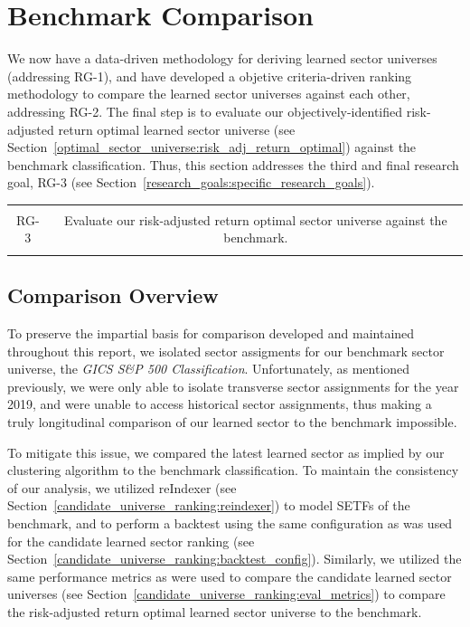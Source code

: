 \documentclass[../main.tex]{subfiles}
\begin{document}
\chapter{Benchmark Comparison} \label{benchmark_comparison}

We now have a data-driven methodology for deriving learned sector universes (addressing RG-1), and have developed a objetive criteria-driven ranking methodology to compare the learned sector universes against each other, addressing RG-2. The final step is to evaluate our objectively-identified risk-adjusted return optimal learned sector universe (see Section~\ref{optimal_sector_universe:risk_adj_return_optimal}) against the benchmark classification. Thus, this section addresses the third and final research goal, RG-3 (see Section~\ref{research_goals:specific_research_goals}).

\begin{table}[h!]
    \centering
    \begin{tabular}{| c | c |}
        \hline
        &  \\
        RG-3 & Evaluate our risk-adjusted return optimal sector universe against the benchmark. \\
        & \\
        \hline
    \end{tabular}
\end{table}

\section{Comparison Overview}

To preserve the impartial basis for comparison developed and maintained throughout this report, we isolated sector assigments for our benchmark sector universe, the \textit{GICS S\&P 500 Classification}. Unfortunately, as mentioned previously, we were only able to isolate transverse sector assignments for the year 2019, and were unable to access historical sector assignments, thus making a truly longitudinal comparison of our learned sector to the benchmark impossible.

To mitigate this issue, we compared the latest learned sector as implied by our clustering algorithm to the benchmark classification. To maintain the consistency of our analysis, we utilized reIndexer (see Section~\ref{candidate_universe_ranking:reindexer}) to model SETFs of the benchmark, and to perform a backtest using the same configuration as was used for the candidate learned sector ranking (see Section~\ref{candidate_universe_ranking:backtest_config}). Similarly, we utilized the same performance metrics as were used to compare the candidate learned sector universes (see Section~\ref{candidate_universe_ranking:eval_metrics}) to compare the risk-adjusted return optimal learned sector universe to the benchmark.
\end{document}

